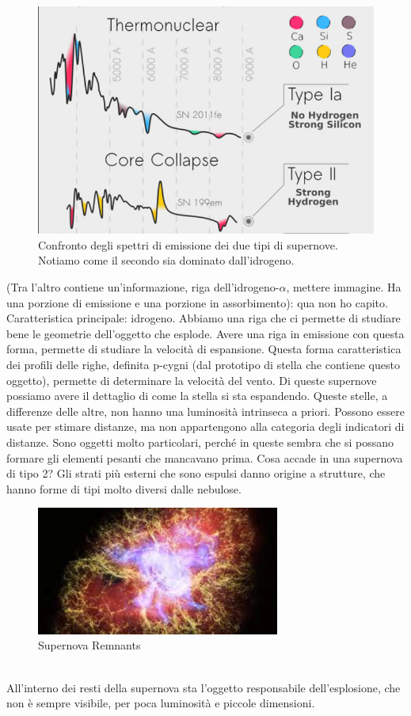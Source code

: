 \documentclass[a4paper,11pt]{article}
\begin{document}
\begin{figure}[h!!]
        \centering
        \includegraphics[width=12cm]{lezione 28 novembre/contenutodiidrogeno.png}
        \caption{Confronto degli spettri di emissione dei due tipi di supernove. Notiamo come il secondo sia dominato dall'idrogeno.}
        \label{lezione 28 novembre/contenutodiidrogeno.png}
    \end{figure}
(Tra l'altro contiene un'informazione, riga dell'idrogeno-$\alpha$, mettere immagine. Ha una porzione di emissione e una porzione in assorbimento): qua non ho capito.\\ Caratteristica principale: idrogeno. Abbiamo una riga che ci permette di studiare bene le geometrie dell'oggetto che esplode. Avere una riga in emissione con questa forma, permette di studiare la velocità di espansione. Questa forma caratteristica dei profili delle righe, definita p-cygni (dal prototipo di stella che contiene questo oggetto), permette di determinare la velocità del vento. Di queste supernove possiamo avere il dettaglio di come la stella si sta espandendo. Queste stelle, a differenze delle altre, non hanno una luminosità intrinseca a priori. Possono essere usate per stimare distanze, ma non appartengono alla categoria degli indicatori di distanze. Sono oggetti molto particolari, perché in queste sembra che si possano formare gli elementi pesanti che mancavano prima. Cosa accade in una supernova di tipo 2? Gli strati più esterni che sono espulsi danno origine a strutture, che hanno forme di tipi molto diversi dalle nebulose. \\
\begin{figure}[h!!]
        \centering
        \includegraphics[width=8cm]{lezione 28 novembre/supernovarem1.png}
        \caption{Supernova Remnants}
        \label{lezione 28 novembre/supernovarem1.png}
    \end{figure}
\\
All'interno dei resti della supernova sta l'oggetto responsabile dell'esplosione, che non è sempre visibile, per poca luminosità e piccole dimensioni. 
\end{document}
